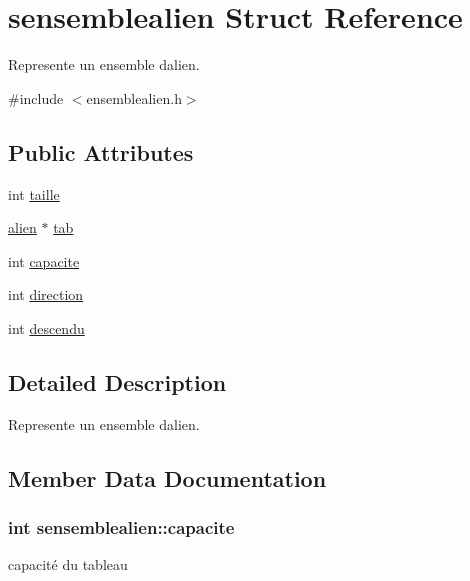 \hypertarget{structsensemblealien}{}\section{sensemblealien Struct Reference}
\label{structsensemblealien}


Represente un ensemble d\textquotesingle{}alien.  




{\ttfamily \#include $<$ensemblealien.\+h$>$}

\subsection*{Public Attributes}
\begin{DoxyCompactItemize}
\item 
int \hyperlink{structsensemblealien_abd74f9d69ddfbe5faa466ce3e2108513}{taille}
\item 
\hyperlink{structsalien}{alien} $\ast$ \hyperlink{structsensemblealien_ab993168369d8bba89e77c0f00a75556a}{tab}
\item 
int \hyperlink{structsensemblealien_a01d0ec12c55ff7fd638dfcef15bd4501}{capacite}
\item 
int \hyperlink{structsensemblealien_a3ce4e10c50aa4bf11011e269f3191dbd}{direction}
\item 
int \hyperlink{structsensemblealien_a0cd3f028bad69f618f0132ffc886d999}{descendu}
\end{DoxyCompactItemize}


\subsection{Detailed Description}
Represente un ensemble d\textquotesingle{}alien. 

\subsection{Member Data Documentation}
\subsubsection[{\texorpdfstring{capacite}{capacite}}]{\setlength{\rightskip}{0pt plus 5cm}int sensemblealien\+::capacite}\hypertarget{structsensemblealien_a01d0ec12c55ff7fd638dfcef15bd4501}{}\label{structsensemblealien_a01d0ec12c55ff7fd638dfcef15bd4501}
capacité du tableau 
